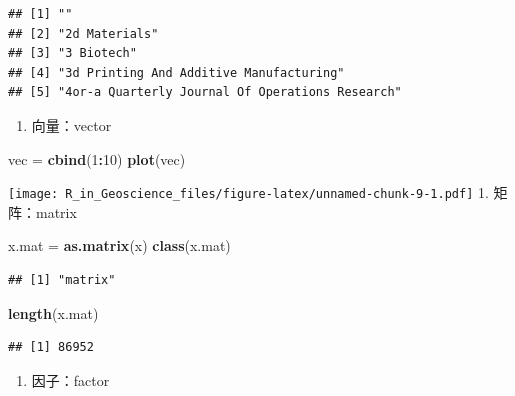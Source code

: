 \documentclass[]{scrbook}
\newenvironment{Shaded}{\begin{snugshade}}{\end{snugshade}}
\newcommand{\DecValTok}[1]{\textcolor[rgb]{0.00,0.00,0.81}{#1}}
\newcommand{\KeywordTok}[1]{\textcolor[rgb]{0.13,0.29,0.53}{\textbf{#1}}}
\newcommand{\NormalTok}[1]{#1}
\newcommand{\OperatorTok}[1]{\textcolor[rgb]{0.81,0.36,0.00}{\textbf{#1}}}
\newcommand{\StringTok}[1]{\textcolor[rgb]{0.31,0.60,0.02}{#1}}
\providecommand{\tightlist}{%
  \setlength{\itemsep}{0pt}\setlength{\parskip}{0pt}}
\begin{document}
\begin{verbatim}
## [1] ""                                              
## [2] "2d Materials"                                  
## [3] "3 Biotech"                                     
## [4] "3d Printing And Additive Manufacturing"        
## [5] "4or-a Quarterly Journal Of Operations Research"
\end{verbatim}

\begin{enumerate}
\def\labelenumi{\arabic{enumi}.}
\tightlist
\item
  向量：vector
\end{enumerate}

\begin{Shaded}
\begin{Highlighting}[]
\NormalTok{vec =}\StringTok{ }\KeywordTok{cbind}\NormalTok{(}\DecValTok{1}\OperatorTok{:}\DecValTok{10}\NormalTok{)}
\KeywordTok{plot}\NormalTok{(vec)}
\end{Highlighting}
\end{Shaded}

\texttt{[image: R\_in\_Geoscience\_files/figure-latex/unnamed-chunk-9-1.pdf]}
1. 矩阵：matrix

\begin{Shaded}
\begin{Highlighting}[]
\NormalTok{x.mat =}\StringTok{ }\KeywordTok{as.matrix}\NormalTok{(x)}
\KeywordTok{class}\NormalTok{(x.mat)}
\end{Highlighting}
\end{Shaded}

\begin{verbatim}
## [1] "matrix"
\end{verbatim}

\begin{Shaded}
\begin{Highlighting}[]
\KeywordTok{length}\NormalTok{(x.mat)}
\end{Highlighting}
\end{Shaded}

\begin{verbatim}
## [1] 86952
\end{verbatim}

\begin{enumerate}
\def\labelenumi{\arabic{enumi}.}
\tightlist
\item
  因子：factor
\end{enumerate}

\begin{Shaded}
\end{Shaded}
\end{document}
